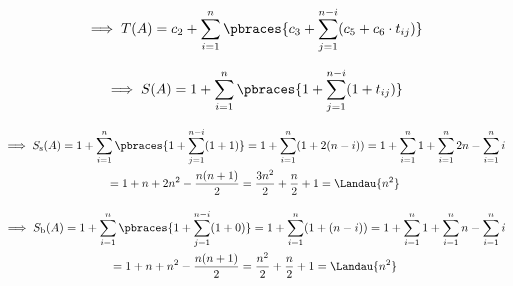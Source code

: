 \begin{solution}
\begin{enumerate}[label = (\alph*)]
  \begin{align*}
    \implies
    T(A) = c_2 + \sum_{i=1}^n \pbraces{c_3 + \sum_{j=1}^{n-i} (c_5 + c_6 \cdot t_{ij})} \\
  \end{align*}

  \begin{align*}
    \implies
    S(A) = 1 + \sum_{i=1}^n \pbraces{1 + \sum_{j=1}^{n-i} (1 + t_{ij})}
  \end{align*}

  \begin{multline*}
    \implies
    S_{\mathrm{s}}(A)
    =
    1 + \sum_{i=1}^n \pbraces {1 + \sum_{j=1}^{n-i} (1 + 1)}
    =
    1 + \sum_{i=1}^n (1 + 2(n-i))
    =
    1 + \sum_{i=1}^n 1 + \sum_{i=1}^n 2n - \sum_{i=1}^n i \\
    =
    1 + n + 2n^2 - \frac{n (n + 1)}{2}
    =
    \frac{3n^2}{2} + \frac{n}{2} + 1
    =
    \Landau{n^2}
  \end{multline*}

  \begin{multline*}
    \implies
    S_{\mathrm{b}}(A)
    =
    1 + \sum_{i=1}^n \pbraces {1 + \sum_{j=1}^{n-i} (1 + 0)}
    =
    1 + \sum_{i=1}^n (1 + (n-i))
    =
    1 + \sum_{i=1}^n 1 + \sum_{i=1}^n n - \sum_{i=1}^n i \\
    =
    1 + n + n^2 - \frac{n (n + 1)}{2}
    =
    \frac{n^2}{2} + \frac{n}{2} + 1
    =
    \Landau{n^2}
  \end{multline*}

\end{enumerate}

\end{solution}

